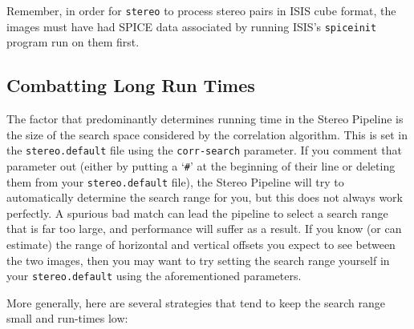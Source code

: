 Remember, in order for \texttt{stereo} to process stereo pairs in
\ac{ISIS} cube format, the images must have had SPICE data associated
by running ISIS's \texttt{spiceinit} program run on them first.

\subsection{Combatting Long Run Times}

The factor that predominantly determines running time in the Stereo
Pipeline is the size of the search space considered by the correlation
algorithm.  This is set in the \texttt{stereo.default} file using
the \texttt{corr-search} parameter.  If you comment that parameter out
(either by putting a `\texttt{\#}' at the beginning of their line or
deleting them from your \texttt{stereo.default} file), the Stereo
Pipeline will try to automatically determine the search range for you,
but this does not always work perfectly.  A spurious bad match can
lead the pipeline to select a search range that is far too large, and
performance will suffer as a result.  If you know (or can estimate)
the range of horizontal and vertical offsets you expect to see between
the two images, then you may want to try setting the search range
yourself in your \texttt{stereo.default} using the aforementioned
parameters.

More generally, here are several strategies that tend to keep the
search range small and run-times low:

